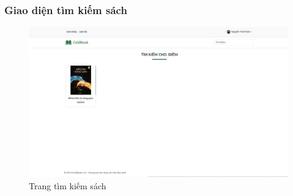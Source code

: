 \subsubsection{Giao diện tìm kiếm sách}
\begin{figure}[H]
  \centering
  \includegraphics[width=1\textwidth]{report/images/client/c_timkiem.png}
  \caption{Trang tìm kiếm sách}
\end{figure}